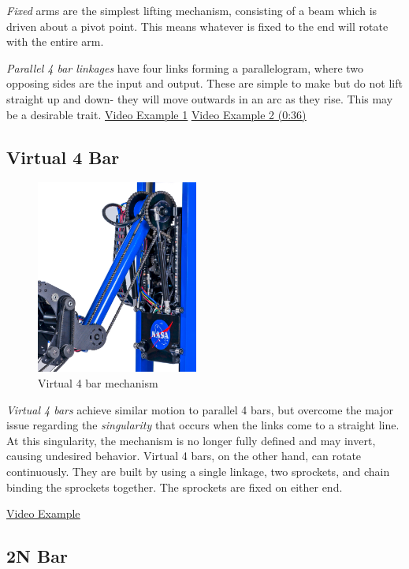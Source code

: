\textit{Fixed} arms are the simplest lifting mechanism, consisting of a beam which is driven about a pivot point. This means whatever is fixed to the end will rotate with the entire arm.

\textit{Parallel 4 bar linkages} have four links forming a parallelogram, where two opposing sides are the input and output. These are simple to make but do not lift straight up and down- they will move outwards in an arc as they rise. This may be a desirable trait. \href{https://www.youtube.com/watch?v=hnxqZlG-508}{\color{red}\underline{Video Example 1}} \href{https://youtu.be/LaV0zbKz-Qg?t=36}{\color{red}\underline{Video Example 2 (0:36)}}
\subsection{Virtual 4 Bar}

\begin{figure}[H]
	\includegraphics[height=2.5in]{imgs/virtual_4bar_1.png}
	\caption{Virtual 4 bar mechanism}
\end{figure}

\textit{Virtual 4 bars} achieve similar motion to parallel 4 bars, but overcome the major issue regarding the \textit{singularity} that occurs when the links come to a straight line. At this singularity, the mechanism is no longer fully defined and may invert, causing undesired behavior. Virtual 4 bars, on the other hand, can rotate continuously. They are built by using a single linkage, two sprockets, and chain binding the sprockets together. The sprockets are fixed on either end.

\href{https://www.youtube.com/watch?v=nH6P4BcwtiE}{\color{red}\underline{Video Example}}

\subsection{2N Bar}


